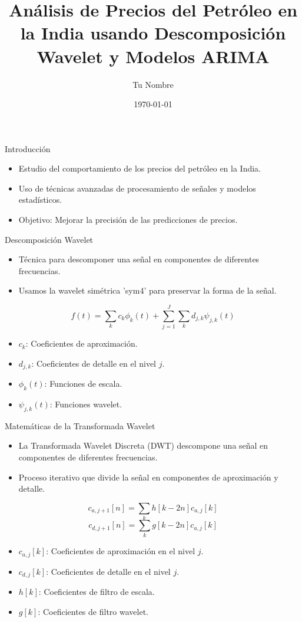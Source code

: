 \documentclass{beamer}
\title{Análisis de Precios del Petróleo en la India usando Descomposición Wavelet y Modelos ARIMA}
\author{Tu Nombre}
\date{\today}
\begin{document}
\frame{\titlepage}

\begin{frame}{Introducción}
\begin{itemize}
    \item Estudio del comportamiento de los precios del petróleo en la India.
    \item Uso de técnicas avanzadas de procesamiento de señales y modelos estadísticos.
    \item Objetivo: Mejorar la precisión de las predicciones de precios.
\end{itemize}
\end{frame}

\begin{frame}{Descomposición Wavelet}
\begin{itemize}
    \item Técnica para descomponer una señal en componentes de diferentes frecuencias.
    \item Usamos la wavelet simétrica 'sym4' para preservar la forma de la señal.
\end{itemize}
\begin{equation}
    f(t) = \sum_{k} c_{k} \phi_{k}(t) + \sum_{j=1}^{J} \sum_{k} d_{j,k} \psi_{j,k}(t)
\end{equation}
\begin{itemize}
    \item \(c_k\): Coeficientes de aproximación.
    \item \(d_{j,k}\): Coeficientes de detalle en el nivel \(j\).
    \item \(\phi_{k}(t)\): Funciones de escala.
    \item \(\psi_{j,k}(t)\): Funciones wavelet.
\end{itemize}
\end{frame}

\begin{frame}{Matemáticas de la Transformada Wavelet}
\begin{itemize}
    \item La Transformada Wavelet Discreta (DWT) descompone una señal en componentes de diferentes frecuencias.
    \item Proceso iterativo que divide la señal en componentes de aproximación y detalle.
\end{itemize}
\begin{equation}
    c_{a,j+1}[n] = \sum_k h[k-2n] c_{a,j}[k]
\end{equation}
\begin{equation}
    c_{d,j+1}[n] = \sum_k g[k-2n] c_{a,j}[k]
\end{equation}
\begin{itemize}
    \item \(c_{a,j}[k]\): Coeficientes de aproximación en el nivel \(j\).
    \item \(c_{d,j}[k]\): Coeficientes de detalle en el nivel \(j\).
    \item \(h[k]\): Coeficientes de filtro de escala.
    \item \(g[k]\): Coeficientes de filtro wavelet.
\end{itemize}
\end{frame}
\end{document}
